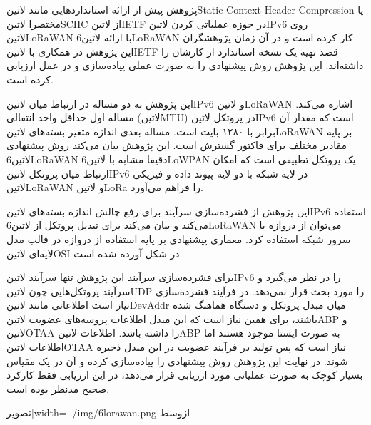 

پژوهش  پیش از ارائه استانداردهایی مانند ‌لاتین{Static Context Header Compression} یا مختصرا ‌لاتین{SCHC} از ‌لاتین{IETF} در حوزه عملیاتی کردن ‌لاتین{IPv6} روی ‌لاتین{LoRaWAN}
با ارائه ‌لاتین{6LoRaWAN} کار کرده است و در آن زمان پژوهشگران این پژوهش در همکاری با ‌لاتین{IETF} قصد تهیه یک نسخه استاندارد از کارشان را داشته‌اند. این پژوهش روش پیشنهادی را به صورت عملی پیاده‌سازی و در عمل ارزیابی کرده است.

این پژوهش به دو مساله در ارتباط میان ‌لاتین{IPv6} و ‌لاتین{LoRaWAN} اشاره می‌کند. مساله اول حداقل واحد انتقالی (‌لاتین{MTU}) در پروتکل ‌لاتین{IPv6} است که مقدار آن برابر با ۱۲۸۰ بایت است.
مساله بعدی اندازه متغیر بسته‌های ‌لاتین{LoRaWAN} بر پایه مقادیر مختلف برای فاکتور گسترش است. این پژوهش بیان می‌کند روش پیشنهادی ‌لاتین{6LoRaWAN}
دقیقا مشابه با ‌لاتین{6LoWPAN} یک پروتکل تطبیقی است که امکان ارتباط میان پروتکل ‌لاتین{IPv6} در لایه شبکه با دو لایه پیوند داده و فیزیکی ‌لاتین{LoRaWAN} و ‌لاتین{LoRa} را فراهم می‌آورد.

این پژوهش از فشرده‌سازی سرآیند برای رفع چالش اندازه بسته‌های ‌لاتین{IPv6} استفاده می‌کند و بیان می‌کند برای تبدیل پروتکل از ‌لاتین{6LoRaWAN} می‌توان از دروازه یا سرور شبکه استفاده کرد.
معماری پیشنهادی بر پایه استفاده از دروازه در قالب مدل لایه‌ای ‌لاتین{OSI} در شکل  آورده شده است.

برای فشرده‌سازی سرآیند این پژوهش تنها سرآیند ‌لاتین{IPv6} را در نظر می‌گیرد و سرآیند پروتکل‌هایی چون ‌لاتین{UDP} را مورد بحث قرار نمی‌دهد.
در فرآیند فشرده‌سازی نیاز است اطلاعاتی مانند ‌لاتین{DevAddr} میان مبدل پروتکل و دستگاه هماهنگ شده باشند، برای همین نیاز است که این مبدل اطلاعات پروسه‌های عضویت ‌لاتین{ABP} و ‌لاتین{OTAA}
را داشته باشد. اطلاعات ‌لاتین{ABP} به صورت ایستا موجود هستند اما اطلاعات ‌لاتین{OTAA} نیاز است که پس تولید در فرآیند عضویت در این مبدل ذخیره شوند.
در نهایت این پژوهش روش پیشنهادی را پیاده‌سازی کرده و آن در یک مقیاس بسیار کوچک به صورت عملیاتی مورد ارزیابی قرار می‌دهد، در این ارزیابی فقط کارکرد صحیح مدنظر بوده است.

‌تصویر[width=\textwidth]{./img/6lorawan.png}
‌ازوسط


